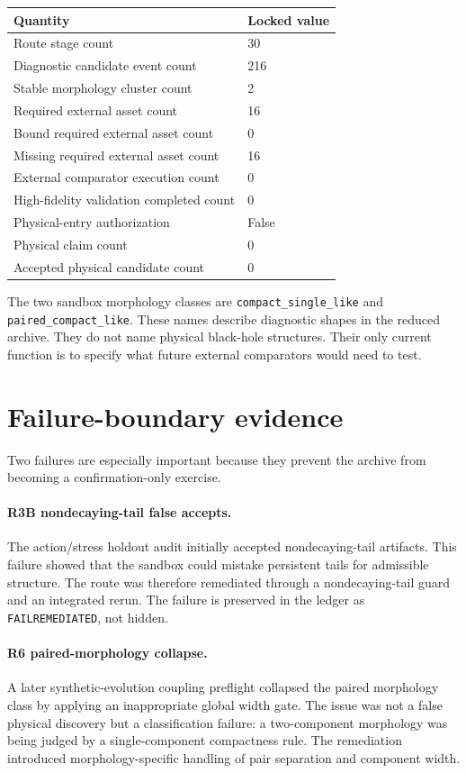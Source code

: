 \documentclass[11pt,a4paper]{article}
\begin{document}
\begin{center}
\begin{tabular}{ll}
\toprule
Quantity & Locked value \\
\midrule
Route stage count & 30 \\
Diagnostic candidate event count & 216 \\
Stable morphology cluster count & 2 \\
Required external asset count & 16 \\
Bound required external asset count & 0 \\
Missing required external asset count & 16 \\
External comparator execution count & 0 \\
High-fidelity validation completed count & 0 \\
Physical-entry authorization & False \\
Physical claim count & 0 \\
Accepted physical candidate count & 0 \\
\bottomrule
\end{tabular}
\end{center}

The two sandbox morphology classes are \texttt{compact\_single\_like} and \texttt{paired\_compact\_like}. These names describe diagnostic shapes in the reduced archive. They do not name physical black-hole structures. Their only current function is to specify what future external comparators would need to test.

\section{Failure-boundary evidence}

Two failures are especially important because they prevent the archive from becoming a confirmation-only exercise.

\paragraph{R3B nondecaying-tail false accepts.}
The action/stress holdout audit initially accepted nondecaying-tail artifacts. This failure showed that the sandbox could mistake persistent tails for admissible structure. The route was therefore remediated through a nondecaying-tail guard and an integrated rerun. The failure is preserved in the ledger as \texttt{FAIL\textrightarrow REMEDIATED}, not hidden.

\paragraph{R6 paired-morphology collapse.}
A later synthetic-evolution coupling preflight collapsed the paired morphology class by applying an inappropriate global width gate. The issue was not a false physical discovery but a classification failure: a two-component morphology was being judged by a single-component compactness rule. The remediation introduced morphology-specific handling of pair separation and component width.
\end{document}

